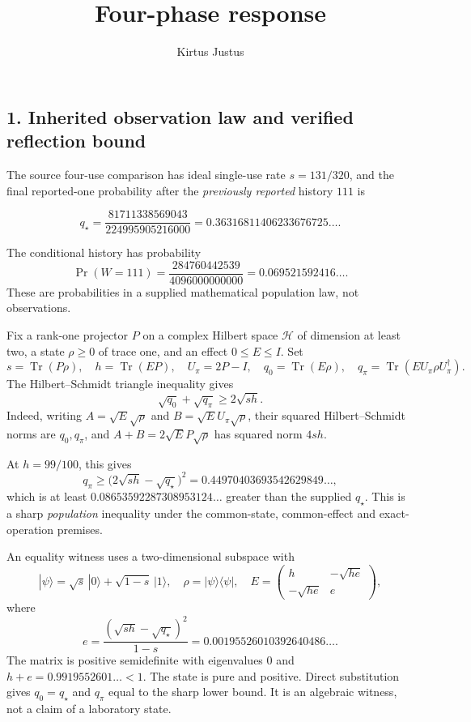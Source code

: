 \documentclass[
  10pt,
  a4paper,
]{article}
\title{Four-phase response}
\author{Kirtus Justus}
\date{}
\begin{document}
\maketitle

\subsection{1. Inherited observation law and verified reflection bound}\label{inherited-observation-law-and-verified-reflection-bound}

The source four-use comparison has ideal single-use rate \(s=131/320\), and the final reported-one probability after the \emph{previously reported} history \(111\) is

\[
q_\star=\frac{81711338569043}{224995905216000}
=0.36316811406233676725\ldots.
\]

The conditional history has probability \[
\Pr(W=111)=\frac{284760442539}{4096000000000}=0.069521592416\ldots.
\] These are probabilities in a supplied mathematical population law, not observations.

Fix a rank-one projector \(P\) on a complex Hilbert space \(\mathcal H\) of dimension at least two, a state \(\rho\geq0\) of trace one, and an effect \(0\leq E\leq I\). Set \[
s=\operatorname{Tr}(P\rho),\quad h=\operatorname{Tr}(EP),\quad
U_\pi=2P-I,\quad q_0=\operatorname{Tr}(E\rho),\quad
q_\pi=\operatorname{Tr}(EU_\pi\rho U_\pi^\dagger).
\] The Hilbert--Schmidt triangle inequality gives \[
\sqrt{q_0}+\sqrt{q_\pi}\geq2\sqrt{sh}.
\] Indeed, writing \(A=\sqrt E\sqrt\rho\) and \(B=\sqrt E U_\pi\sqrt\rho\), their squared Hilbert--Schmidt norms are \(q_0,q_\pi\), and \(A+B=2\sqrt E P\sqrt\rho\) has squared norm \(4sh\).

At \(h=99/100\), this gives \[
q_\pi\geq\bigl(2\sqrt{sh}-\sqrt{q_\star}\bigr)^2
=0.44970403693542629849\ldots,
\] which is at least \(0.08653592287308953124\ldots\) greater than the supplied \(q_\star\). This is a sharp \emph{population} inequality under the common-state, common-effect and exact-operation premises.

An equality witness uses a two-dimensional subspace with \[
|\psi\rangle=\sqrt s\,|0\rangle+\sqrt{1-s}\,|1\rangle,
\quad\rho=|\psi\rangle\langle\psi|,
\quad E=\begin{pmatrix}h&-\sqrt{h e}\\-\sqrt{h e}&e\end{pmatrix},
\] where \[
e=\frac{(\sqrt{sh}-\sqrt{q_\star})^2}{1-s}
=0.00195526010392640486\ldots.
\] The matrix is positive semidefinite with eigenvalues \(0\) and \(h+e=0.9919552601\ldots<1\). The state is pure and positive. Direct substitution gives \(q_0=q_\star\) and \(q_\pi\) equal to the sharp lower bound. It is an algebraic witness, not a claim of a laboratory state.
\end{document}
